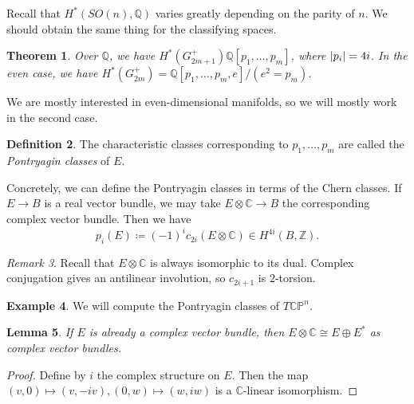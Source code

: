 \documentclass[leqno, openany]{memoir}
\newtheorem{thm}{Theorem}[section]
\newtheorem{lem}[thm]{Lemma}
\theoremstyle{definition}
\newtheorem{defn}[thm]{Definition}
\newtheorem{exm}[thm]{Example}
\theoremstyle{remark}
\newtheorem{rmk}[thm]{Remark}
\theoremstyle{plain}
\theoremstyle{definition}
\theoremstyle{remark}
\newcommand{\C}{\mathbb{C}}
\newcommand{\Z}{\mathbb{Z}}
\newcommand{\Q}{\mathbb{Q}}
\renewcommand{\P}{\mathbb{P}}
\begin{document}
Recall that $H^*(SO(n), \Q)$ varies greatly depending on the parity of $n$. We should obtain the same thing for the classifying spaces.

\begin{thm}
    Over $\Q$, we have $H^*(G_{2m+1}^+) \Q[p_1, \ldots, p_m]$, where $\abs{p_i} = 4i$. In the even case, we have $H^*(G_{2m}^+) = \Q[p_1, \ldots, p_m, e]/(e^2=p_m)$.
\end{thm}
We are mostly interested in even-dimensional manifolds, so we will mostly work in the second case.

\begin{defn}
    The characteristic classes corresponding to $p_1, \ldots, p_m$ are called the \textit{Pontryagin classes} of $E$. 
\end{defn}

Concretely, we can define the Pontryagin classes in terms of the Chern classes. If $E \to B$ is a real vector bundle, we may take $E \otimes \C \to B$ the corresponding complex vector bundle. Then we have
\[ p_i(E) \coloneqq {(-1)}^i c_{2i}(E \otimes \C) \in H^{4i}(B, \Z). \]

\begin{rmk}
    Recall that $E \otimes \C$ is always isomorphic to its dual. Complex conjugation gives an antilinear involution, so $c_{2i+1}$ is $2$-torsion.
\end{rmk}

\begin{exm}
    We will compute the Pontryagin classes of $T\C\P^n$.
\end{exm}

\begin{lem}
    If $E$ is already a complex vector bundle, then $E \otimes \C \cong E \oplus E^*$ as complex vector bundles.
\end{lem}

\begin{proof}
    Define by $i$ the complex structure on $E$. Then the map $(v,0) \mapsto (v,-iv), (0,w) \mapsto (w,iw)$ is a $\C$-linear isomorphism.
\end{proof}
\end{document}
